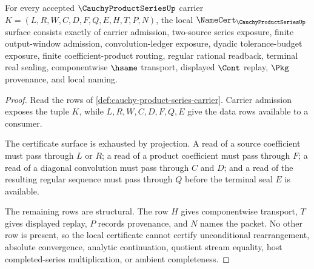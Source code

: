 \begin{theorem}
\label{thm:cauchy-product-series-namecert-obligations}
For every accepted $\CauchyProductSeriesUp$ carrier $K=(L,R,W,C,D,F,Q,E,H,T,P,N)$, the local $\NameCert_{\CauchyProductSeriesUp}$ surface consists exactly of carrier admission, two-source series exposure, finite output-window admission, convolution-ledger exposure, dyadic tolerance-budget exposure, finite coefficient-product routing, regular rational readback, terminal real sealing, componentwise $\hsame$ transport, displayed $\Cont$ replay, $\Pkg$ provenance, and local naming.
\end{theorem}
\begin{proof}
Read the rows of \autoref{def:cauchy-product-series-carrier}. Carrier admission exposes the tuple $K$, while $L,R,W,C,D,F,Q,E$ give the data rows available to a consumer.

The certificate surface is exhausted by projection. A read of a source coefficient must pass through $L$ or $R$; a read of a product coefficient must pass through $F$; a read of a diagonal convolution must pass through $C$ and $D$; and a read of the resulting regular sequence must pass through $Q$ before the terminal seal $E$ is available.

The remaining rows are structural. The row $H$ gives componentwise transport, $T$ gives displayed replay, $P$ records provenance, and $N$ names the packet. No other row is present, so the local certificate cannot certify unconditional rearrangement, absolute convergence, analytic continuation, quotient stream equality, host completed-series multiplication, or ambient completeness.
\end{proof}


